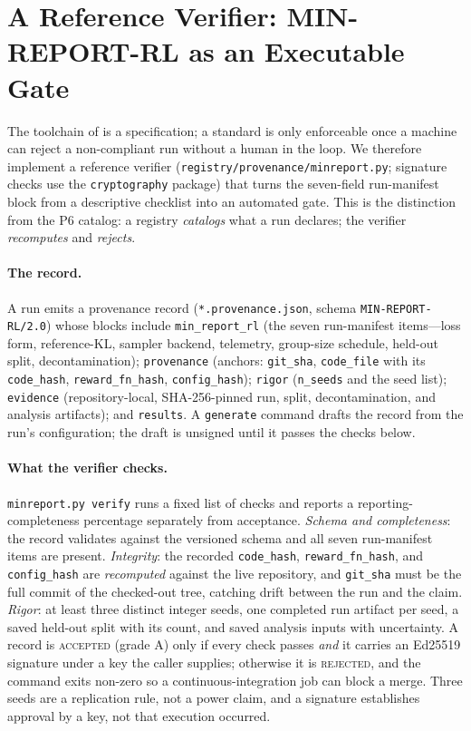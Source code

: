 \section{A Reference Verifier: MIN-REPORT-RL as an Executable Gate}
\label{sec:p5-verifier}
The toolchain of  is a specification; a standard is
only enforceable once a machine can reject a non-compliant run without a human
in the loop. We therefore implement a reference verifier
(\texttt{registry/provenance/minreport.py}; signature checks use the
\texttt{cryptography} package) that turns the
seven-field run-manifest block from a descriptive checklist into an automated gate. This is
the distinction from the P6 catalog: a registry \emph{catalogs} what a run declares; the verifier
\emph{recomputes} and \emph{rejects}.

\paragraph{The record.} A run emits a provenance record
(\texttt{*.provenance.json}, schema \texttt{MIN-REPORT-RL/2.0}) whose blocks
include \texttt{min\_report\_rl} (the seven run-manifest items---loss form,
reference-KL, sampler backend, telemetry, group-size schedule, held-out split,
decontamination); \texttt{provenance} (anchors: \texttt{git\_sha},
\texttt{code\_file} with its \texttt{code\_hash}, \texttt{reward\_fn\_hash},
\texttt{config\_hash}); \texttt{rigor} (\texttt{n\_seeds} and the seed list);
\texttt{evidence} (repository-local, SHA-256-pinned run, split,
decontamination, and analysis artifacts); and \texttt{results}. A
\texttt{generate} command drafts the record from the run's configuration; the
draft is unsigned until it passes the checks below.

\paragraph{What the verifier checks.} \texttt{minreport.py verify} runs a
fixed list of checks and reports a reporting-completeness percentage
separately from acceptance. \emph{Schema and completeness}: the record
validates against the versioned schema and all seven run-manifest items are
present. \emph{Integrity}: the recorded \texttt{code\_hash},
\texttt{reward\_fn\_hash}, and \texttt{config\_hash} are \emph{recomputed}
against the live repository, and \texttt{git\_sha} must be the full commit
of the checked-out tree, catching drift between the run and the claim.
\emph{Rigor}: at least three distinct integer seeds, one completed run
artifact per seed, a saved held-out split with its count, and saved analysis
inputs with uncertainty. A record is \textsc{accepted} (grade A) only if every
check passes \emph{and} it carries an Ed25519 signature under a key the caller
supplies; otherwise it is \textsc{rejected}, and the command exits non-zero so
a continuous-integration job can block a merge. Three seeds are a replication
rule, not a power claim, and a signature establishes approval by a key, not
that execution occurred.

